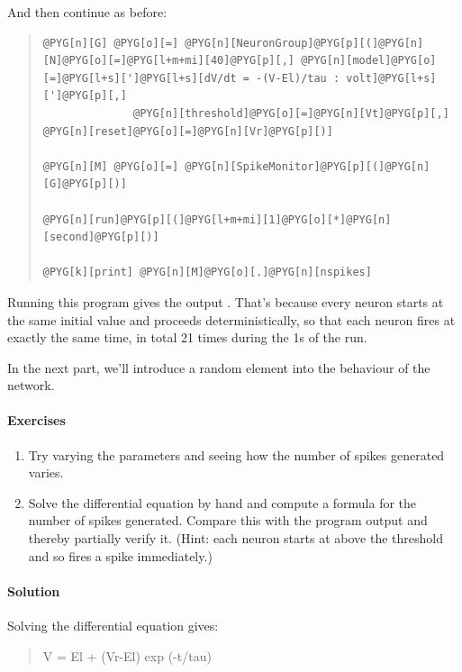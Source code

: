 \documentclass[letterpaper,10pt,english]{manual}
\begin{document}
And then continue as before:
\begin{quote}

\begin{Verbatim}[commandchars=@\[\]]
@PYG[n][G] @PYG[o][=] @PYG[n][NeuronGroup]@PYG[p][(]@PYG[n][N]@PYG[o][=]@PYG[l+m+mi][40]@PYG[p][,] @PYG[n][model]@PYG[o][=]@PYG[l+s][']@PYG[l+s][dV/dt = -(V-El)/tau : volt]@PYG[l+s][']@PYG[p][,]
              @PYG[n][threshold]@PYG[o][=]@PYG[n][Vt]@PYG[p][,] @PYG[n][reset]@PYG[o][=]@PYG[n][Vr]@PYG[p][)]

@PYG[n][M] @PYG[o][=] @PYG[n][SpikeMonitor]@PYG[p][(]@PYG[n][G]@PYG[p][)]

@PYG[n][run]@PYG[p][(]@PYG[l+m+mi][1]@PYG[o][*]@PYG[n][second]@PYG[p][)]

@PYG[k][print] @PYG[n][M]@PYG[o][.]@PYG[n][nspikes]
\end{Verbatim}
\end{quote}

Running this program gives the output . That's because
every neuron starts at the same initial value and proceeds
deterministically, so that each neuron fires at exactly the
same time, in total 21 times during the 1s of the run.

In the next part, we'll introduce a random element into the
behaviour of the network.


\paragraph{Exercises}
\begin{enumerate}
\item {} 
Try varying the parameters and seeing how the number of
spikes generated varies.

\item {} 
Solve the differential equation by hand and compute a
formula for the number of spikes generated. Compare this
with the program output and thereby partially verify it.
(Hint: each neuron starts at above the threshold and so
fires a spike immediately.)

\end{enumerate}


\paragraph{Solution}

Solving the differential equation gives:
\begin{quote}

V = El + (Vr-El) exp (-t/tau)
\end{quote}
\end{document}
